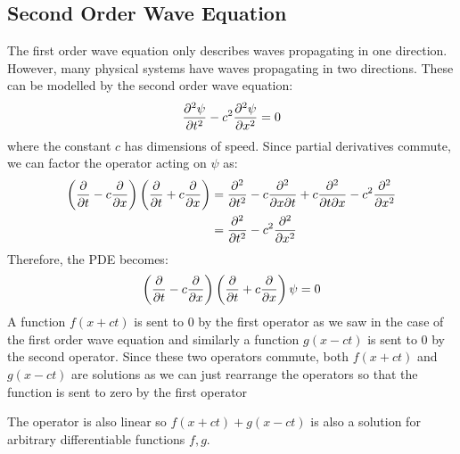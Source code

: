 \documentclass[../main.tex]{subfiles}
\begin{document}
\subsection{Second Order Wave Equation}
The first order wave equation only describes waves propagating in one direction.
However, many physical systems have waves propagating in two directions.
These can be modelled by the second order wave equation:
\[
  \pderiv[2]{\psi}{t} - c^2\pderiv[2]{\psi}{x} = 0
\]
where the constant $c$ has dimensions of speed.
Since partial derivatives commute, we can factor the operator acting on $\psi$ as:
\begin{align*}
  \left(\pderiv{}{t} - c \pderiv{}{x}\right)\left(\pderiv{}{t} + c \pderiv{}{x}\right) &= \pderiv[2]{}{t} - c \frac{\partial^2}{\partial x \partial t} + c \frac{\partial^2}{\partial t \partial x} - c^2 \pderiv[2]{}{x} \\
                                                                                       &= \pderiv[2]{}{t} - c^2 \pderiv[2]{}{x}
\end{align*}
Therefore, the PDE becomes:
\[
  \left(\pderiv{}{t} - c \pderiv{}{x}\right)\left(\pderiv{}{t} + c \pderiv{}{x}\right)\psi = 0
\]
A function $f(x + ct)$ is sent to 0 by the first operator as we saw in the case of the first order wave equation and similarly a function $g(x - ct)$ is sent to 0 by the second operator.
Since these two operators commute, both $f(x + ct)$ and $g(x - ct)$ are solutions as we can just rearrange the operators so that the function is sent to zero by the first operator

The operator is also linear so $f(x + ct) + g(x - ct)$ is also a solution for arbitrary differentiable functions $f, g$.
\end{document}
